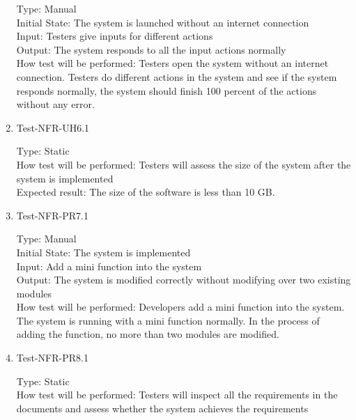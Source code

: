 \documentclass[12pt, titlepage]{article}
\begin{document}
\begin{enumerate}
Type: Manual\\

Initial State: The system is launched without an internet connection\\

Input: Testers give inputs for different actions\\

Output: The system responds to all the input actions normally\\

How test will be performed: Testers open the system without an internet connection. Testers do different actions in the system and see if the system responds normally, the system should finish 100 percent of the actions without any error.


\item{Test-NFR-UH6.1\\}

Type: Static\\

How test will be performed: Testers will assess the size of the system after the system is implemented\\

Expected result: The size of the software is less than 10 GB.


\item{Test-NFR-PR7.1\\}

Type: Manual\\

Initial State: The system is implemented\\

Input: Add a mini function into the system\\

Output: The system is modified correctly without modifying over two existing modules\\

How test will be performed: Developers add a mini function into the system. The system is running with a mini function normally. In the process of adding the function, no more than two modules are modified.


\item{Test-NFR-PR8.1\\}

Type: Static\\

How test will be performed: Testers will inspect all the requirements in the documents and assess whether the system achieves the requirements\\


\end{enumerate}
\end{document}
